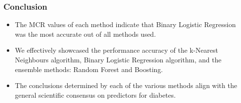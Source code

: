 \documentclass{beamer}
\begin{document}
\begin{frame}
    \frametitle{Conclusion}
        \begin{itemize}
            \item The MCR values of each method indicate that Binary Logistic Regression was the most accurate out of all methods used.
            \item We effectively showcased
            the performance accuracy of the k-Nearest Neighbours algorithm, Binary Logistic Regression algorithm, and the ensemble methods: Random Forest and Boosting. 
            \item The conclusions
            determined by each of the various methods align with the general scientific consensus on predictors for diabetes.
        \end{itemize}
\end{frame}

\end{document}
